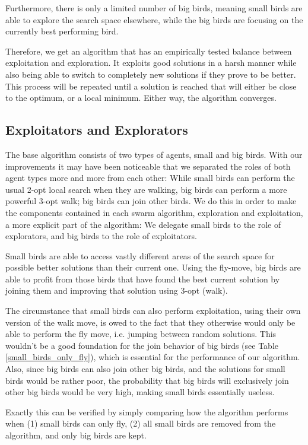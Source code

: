 Furthermore, there is only a limited number of big birds, meaning small birds are able
to explore the search space elsewhere, while the big birds are focusing on the currently best performing bird.

Therefore, we get an algorithm that has an empirically tested balance between exploitation and exploration.
It exploits good solutions in a harsh manner while also being able to switch to completely new solutions if they prove to be better.
This process will be repeated until a solution is reached that will either be close to the optimum, or a local minimum.
Either way, the algorithm converges.

\subsection{Exploitators and Explorators}
The base algorithm consists of two types of agents, small and big birds.
With our improvements it may have been noticeable that we separated the roles
of both agent types more and more from each other:
While small birds can perform the usual 2-opt local search when they are walking,
big birds can perform a more powerful 3-opt walk;
big birds can join other birds.
We do this in order to make the components contained in each swarm algorithm,
exploration and exploitation, a more explicit part of the algorithm:
We delegate small birds to the role of explorators, and big birds to the role of exploitators.

Small birds are able to access vastly different areas of the search space for possible better
solutions than their current one. Using the fly-move, big birds are able to profit
from those birds that have found the best current solution by joining them and
improving that solution using 3-opt (walk).


The circumstance that small birds can also perform exploitation, using their own version of the walk move,
is owed to the fact that they otherwise would only be able to perform
the fly move, i.e. jumping between random solutions.
This wouldn’t be a good foundation for the join behavior of big birds (see Table \ref{small_birds_only_fly}),
which is essential for the performance of our algorithm.
Also, since big birds can also join other big birds,
and the solutions for small birds would be rather poor, the probability that
big birds will exclusively join other big birds would be very high,
making small birds essentially useless.

Exactly this can be verified by simply comparing how 
the algorithm performs when (1) small birds can only fly,
(2) all small birds are removed from the algorithm, and only big birds are kept.

